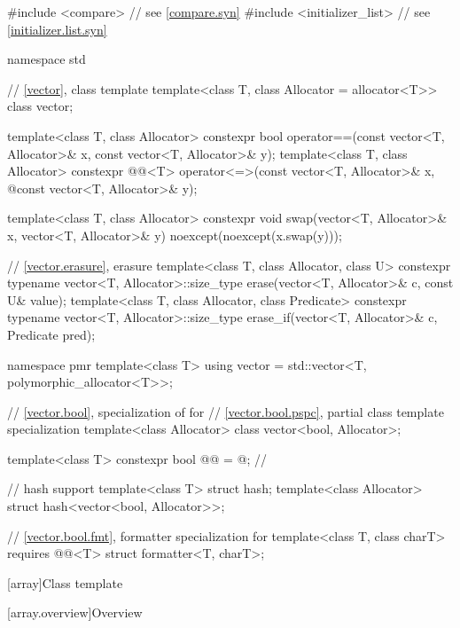 %
\begin{codeblock}
#include <compare>              // see \ref{compare.syn}
#include <initializer_list>     // see \ref{initializer.list.syn}

namespace std {
  // \ref{vector}, class template 
  template<class T, class Allocator = allocator<T>> class vector;

  template<class T, class Allocator>
    constexpr bool operator==(const vector<T, Allocator>& x, const vector<T, Allocator>& y);
  template<class T, class Allocator>
    constexpr @@<T> operator<=>(const vector<T, Allocator>& x,
              @\itcorr@                                      const vector<T, Allocator>& y);

  template<class T, class Allocator>
    constexpr void swap(vector<T, Allocator>& x, vector<T, Allocator>& y)
      noexcept(noexcept(x.swap(y)));

  // \ref{vector.erasure}, erasure
  template<class T, class Allocator, class U>
    constexpr typename vector<T, Allocator>::size_type
      erase(vector<T, Allocator>& c, const U& value);
  template<class T, class Allocator, class Predicate>
    constexpr typename vector<T, Allocator>::size_type
      erase_if(vector<T, Allocator>& c, Predicate pred);

  namespace pmr {
    template<class T>
      using vector = std::vector<T, polymorphic_allocator<T>>;
  }

  // \ref{vector.bool}, specialization of  for 
  // \ref{vector.bool.pspc}, partial class template specialization 
  template<class Allocator>
    class vector<bool, Allocator>;

  template<class T>
    constexpr bool @@ = @\seebelow@;          // \expos

  // hash support
  template<class T> struct hash;
  template<class Allocator> struct hash<vector<bool, Allocator>>;

  // \ref{vector.bool.fmt}, formatter specialization for 
  template<class T, class charT> requires @@<T>
    struct formatter<T, charT>;
}
\end{codeblock}

[array]{Class template }
%

[array.overview]{Overview}

